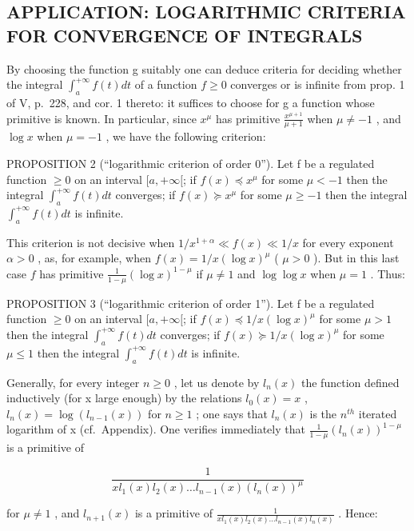 \subsection{APPLICATION: LOGARITHMIC CRITERIA FOR CONVERGENCE OF INTEGRALS}

By choosing the function g suitably one can deduce criteria for deciding whether the integral \(\int_{a}^{+\infty} f(t) dt\) of a function \(f \geqslant 0\) converges or is infinite from prop. 1 of V, p.~228, and cor. 1 thereto: it suffices to choose for g a function whose primitive is known. In particular, since \(x^{\mu}\) has primitive \(\frac{x^{\mu+1}}{\mu+1}\) when \(\mu \neq -1\) , and \(\log x\) when \(\mu = -1\) , we have the following criterion:

PROPOSITION 2 (``logarithmic criterion of order 0''). Let f be a regulated function \(\geqslant 0\) on an interval \([a, +\infty[\); if \(f(x) \preccurlyeq x^{\mu}\) for some \(\mu < -1\) then the integral \(\int_{a}^{+\infty} f(t) dt\) converges; if \(f(x) \succcurlyeq x^{\mu}\) for some \(\mu \geqslant -1\) then the integral \(\int_{a}^{+\infty} f(t) dt\) is infinite.

This criterion is not decisive when \(1 / x^{1 + \alpha} \ll f(x) \ll 1 / x\) for every exponent \(\alpha > 0\) , as, for example, when \(f(x) = 1 / x(\log x)^{\mu}\) ( \(\mu > 0\) ). But in this last case \(f\) has primitive \(\frac{1}{1 - \mu} (\log x)^{1 - \mu}\) if \(\mu \neq 1\) and \(\log \log x\) when \(\mu = 1\) . Thus:

PROPOSITION 3 (``logarithmic criterion of order 1''). Let f be a regulated function \(\geqslant 0\) on an interval \([a, +\infty[\); if \(f(x) \preccurlyeq 1/x(\log x)^{\mu}\) for some \(\mu > 1\) then the integral \(\int_{a}^{+\infty} f(t) dt\) converges; if \(f(x) \succcurlyeq 1/x(\log x)^{\mu}\) for some \(\mu \leqslant 1\) then the integral \(\int_{a}^{+\infty} f(t) dt\) is infinite.

Generally, for every integer \(n \geqslant 0\) , let us denote by \(l_{n}(x)\) the function defined inductively (for x large enough) by the relations \(l_{0}(x) = x\) , \(l_{n}(x) = \log(l_{n-1}(x))\) for \(n \geqslant 1\) ; one says that \(l_{n}(x)\) is the \(n^{th}\) iterated logarithm of x (cf.~Appendix). One verifies immediately that \(\frac{1}{1 - \mu}\left(l_{n}(x)\right)^{1 - \mu}\) is a primitive of

\[
\frac {1}{x l _ {1} (x) l _ {2} (x) \dots l _ {n - 1} (x) \left(l _ {n} (x)\right) ^ {\mu}}
\]

for \(\mu \neq 1\) , and \(l_{n+1}(x)\) is a primitive of \(\frac{1}{xl_1(x)l_2(x)\ldots l_{n-1}(x)l_n(x)}\) . Hence:

